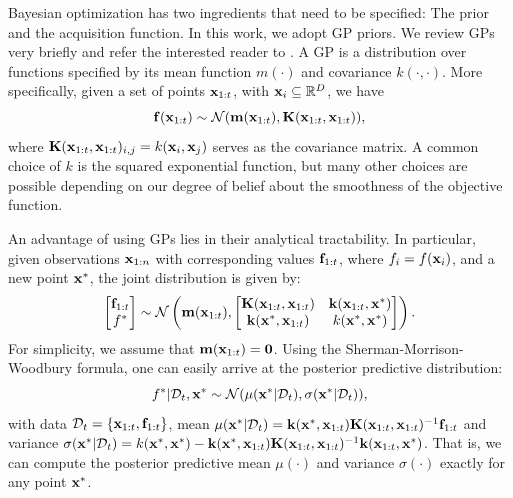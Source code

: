 \documentclass{article}
\begin{document}
Bayesian optimization has two ingredients that need to be specified: The prior and the acquisition function. In this work, we adopt GP priors. We review GPs very briefly and refer the interested reader to \cite{Rasmussen:2006}.
A GP is a distribution over functions specified by its mean function $m(\cdot)$ and covariance $k(\cdot,\cdot)$. More specifically, given a set of points $\mathbf{x}_{1:t}$, with $\mathbf{x}_i \subseteq \mathbb{R}^D$, we have 
$$
\mathbf{f}(\mathbf{x}_{1:t}) \sim \mathcal{N}(\mathbf{m}(\mathbf{x}_{1:t}), \mathbf{K}(\mathbf{x}_{1:t}, \mathbf{x}_{1:t})),
$$
where $\mathbf{K}(\mathbf{x}_{1:t}, \mathbf{x}_{1:t})_{i,j} = k(\mathbf{x}_i, \mathbf{x}_j)$
serves as the covariance matrix. A common choice of $k$ is the squared exponential function,
but many other choices are possible depending on our degree of belief about the smoothness of the objective function.

An advantage of using GPs lies in their analytical tractability. In particular, given observations $\mathbf{x}_{1:n}$ with corresponding values $\mathbf{f}_{1:t}$, where $f_i = f(\mathbf{x}_i)$,  and a new point $\mathbf{x}^{*}$, the joint distribution is given by:
$$
\begin{bmatrix}\mathbf{f}_{1:t} \\
f^* \end{bmatrix} \sim \mathcal{N}\left( \mathbf{m}(\mathbf{x}_{1:t}),  \begin{bmatrix}
\mathbf{K}(\mathbf{x}_{1:t}, \mathbf{x}_{1:t}) & \mathbf{k}(\mathbf{x}_{1:t}, \mathbf{x}^*)\\
\mathbf{k}(\mathbf{x}^*, \mathbf{x}_{1:t}) & k(\mathbf{x}^*, \mathbf{x}^*)\end{bmatrix}\right).
$$
For simplicity, we assume that $\mathbf{m}(\mathbf{x}_{1:t}) = \mathbf{0}$. Using the Sherman-Morrison-Woodbury formula, one can easily arrive at the posterior predictive distribution:
$$
f^* | {\cal D}_t, \mathbf{x}^* \sim \mathcal{N}(\mu(\mathbf{x}^*|{\cal D}_t), \sigma(\mathbf{x}^*|{\cal D}_t)),
$$
with data ${\cal D}_t = \{\mathbf{x}_{1:t}, \mathbf{f}_{1:t} \}$, mean
$\mu(\mathbf{x}^*|{\cal D}_t) = \mathbf{k}(\mathbf{x}^*, \mathbf{x}_{1:t}) \mathbf{K}(\mathbf{x}_{1:t}, \mathbf{x}_{1:t})^{-1} \mathbf{f}_{1:t}$ and variance $\sigma(\mathbf{x}^*|{\cal D}_t) = k(\mathbf{x}^*, \mathbf{x}^*)-\mathbf{k}(\mathbf{x}^*, \mathbf{x}_{1:t}) \mathbf{K}(\mathbf{x}_{1:t},\mathbf{x}_{1:t})^{-1} \mathbf{k}(\mathbf{x}_{1:t}, \mathbf{x}^*)$.
That is, we can compute the posterior predictive mean $\mu(\cdot)$ and variance $\sigma(\cdot)$ exactly for any point $\mathbf{x}^*$.
\end{document}
